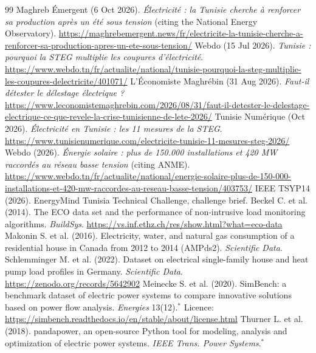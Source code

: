 \vspace{10pt}
\begin{thebibliography}{99}\small
\setlength{\itemsep}{1.5pt}
 Maghreb \'Emergent (6 Oct 2026). \emph{\'Electricit\'e : la Tunisie cherche \`a renforcer sa production apr\`es un \'et\'e sous tension} (citing the National Energy Observatory). \url{https://maghrebemergent.news/fr/electricite-la-tunisie-cherche-a-renforcer-sa-production-apres-un-ete-sous-tension/}
 Webdo (15 Jul 2026). \emph{Tunisie : pourquoi la STEG multiplie les coupures d'\'electricit\'e}. \url{https://www.webdo.tn/fr/actualite/national/tunisie-pourquoi-la-steg-multiplie-les-coupures-delectricite/401071/}
 L'\'Economiste Maghr\'ebin (31 Aug 2026). \emph{Faut-il d\'etester le d\'elestage \'electrique ?} \url{https://www.leconomistemaghrebin.com/2026/08/31/faut-il-detester-le-delestage-electrique-ce-que-revele-la-crise-tunisienne-de-lete-2026/}
 Tunisie Num\'erique (Oct 2026). \emph{\'Electricit\'e en Tunisie : les 11 mesures de la STEG}. \url{https://www.tunisienumerique.com/electricite-tunisie-11-mesures-steg-2026/}
 Webdo (2026). \emph{\'Energie solaire : plus de 150.000 installations et 420 MW raccord\'es au r\'eseau basse tension} (citing ANME). \url{https://www.webdo.tn/fr/actualite/national/energie-solaire-plus-de-150-000-installations-et-420-mw-raccordes-au-reseau-basse-tension/403753/}
 IEEE TSYP14 (2026). EnergyMind Tunisia Technical Challenge, challenge brief.
 Beckel C. et al. (2014). The ECO data set and the performance of non-intrusive load monitoring algorithms. \emph{BuildSys}. \url{https://vs.inf.ethz.ch/res/show.html?what=eco-data}
 Makonin S. et al. (2016). Electricity, water, and natural gas consumption of a residential house in Canada from 2012 to 2014 (AMPds2). \emph{Scientific Data}.
 Schlemminger M. et al. (2022). Dataset on electrical single-family house and heat pump load profiles in Germany. \emph{Scientific Data}. \url{https://zenodo.org/records/5642902}
 Meinecke S. et al. (2020). SimBench: a benchmark dataset of electric power systems to compare innovative solutions based on power flow analysis. \emph{Energies} 13(12).$^{*}$ Licence: \url{https://simbench.readthedocs.io/en/stable/about/license.html}
 Thurner L. et al. (2018). pandapower, an open-source Python tool for modeling, analysis and optimization of electric power systems. \emph{IEEE Trans. Power Systems}.$^{*}$

\end{thebibliography}
